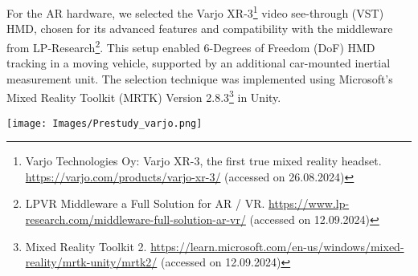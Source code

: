 For the AR hardware, we selected the Varjo XR-3\footnote{\label{foot:Varjo}Varjo Technologies Oy: Varjo XR-3, the first true mixed reality headset. \url{https://varjo.com/products/varjo-xr-3/} (accessed on 26.08.2024)} video see-through (VST) HMD, chosen for its advanced features and compatibility with the middleware from LP-Research\footnote{\label{foot:lpvr}LPVR Middleware a Full Solution for AR / VR. \url{https://www.lp-research.com/middleware-full-solution-ar-vr/} (accessed on 12.09.2024)}. This setup enabled 6-Degrees of Freedom (DoF) HMD tracking in a moving vehicle, supported by an additional car-mounted inertial measurement unit. The selection technique was implemented using Microsoft's Mixed Reality Toolkit (MRTK) Version 2.8.3\footnote{Mixed Reality Toolkit 2. \url{https://learn.microsoft.com/en-us/windows/mixed-reality/mrtk-unity/mrtk2/} (accessed on 12.09.2024)} in Unity. 


\begin{figure*}[ht]
    \centering
    \texttt{[image: Images/Prestudy\_varjo.png]}
    \caption{View of the pre-study. We use the Varjo XR-3 with additional optical tracking (left). POIs are visualized as spheres outside the vehicle (right). The POI with the red crosshair had to be selected via eye-gaze and a hardware button.}
    \label{fig:prestudy_varjoview}
\end{figure*}


